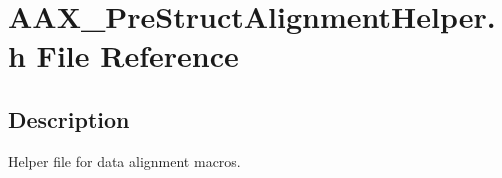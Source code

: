 \hypertarget{a00659}{}\section{A\+A\+X\+\_\+\+Pre\+Struct\+Alignment\+Helper.\+h File Reference}
\label{a00659}


\subsection{Description}
Helper file for data alignment macros. 

